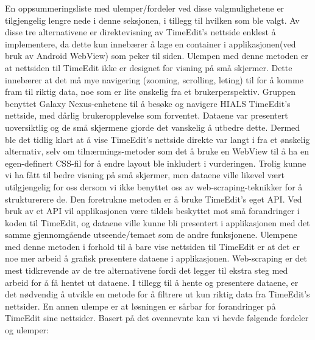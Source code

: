 \documentclass[../main.tex]{subfiles}
\begin{document}
En oppsummeringsliste med ulemper/fordeler ved disse valgmulighetene er tilgjengelig lengre nede i denne seksjonen, i tillegg til hvilken som ble valgt. \newline
\newline
Av disse tre alternativene er direktevisning av TimeEdit’s nettside enklest å implementere, da dette kun innebærer å lage en container i applikasjonen(ved bruk av Android WebView) som peker til siden. Ulempen med denne metoden er at nettsiden til TimeEdit ikke er designet for visning på små skjermer. Dette innebærer at det må mye navigering (zooming, scrolling, leting) til for å komme fram til riktig data, noe som er lite ønskelig fra et brukerperspektiv.\newline
Gruppen benyttet Galaxy Nexus-enhetene til å besøke og navigere HIALS TimeEdit’s nettside, med dårlig brukeropplevelse som forventet. Dataene var presentert uoversiktlig og de små skjermene gjorde det vanskelig å utbedre dette. Dermed ble det tidlig klart at å vise TimeEdit’s nettside direkte var langt i fra et ønskelig alternativ, selv om tilnærmings-metoder som det å bruke en WebView til å ha en egen-definert CSS-fil for å endre layout ble inkludert i vurderingen. \newline
Trolig kunne vi ha fått til bedre visning på små skjermer, men dataene ville likevel vært utilgjengelig for oss dersom vi ikke benyttet oss av web-scraping-teknikker for å strukturerere de.\newline
\newline
Den foretrukne metoden er å bruke TimeEdit’s eget API. Ved bruk av et API vil applikasjonen være tildels beskyttet mot små forandringer i koden til TimeEdit, og dataene ville kunne bli presentert i applikasjonen med det samme gjennomgående utseende/temaet som de andre funksjonene. Ulempene med denne metoden i forhold til å bare vise nettsiden til TimeEdit er at det er noe mer arbeid å grafisk presentere dataene i applikasjonen.\newline
Web-scraping er det mest tidkrevende av de tre alternativene fordi det legger til ekstra steg med arbeid for å få hentet ut dataene. I tillegg til å hente og presentere dataene, er det nødvendig å utvikle en metode for å filtrere ut kun riktig data fra TimeEdit’s nettsider. En annen ulempe er at løsningen er sårbar for forandringer på TimeEdit sine nettsider.
Basert på det ovennevnte kan vi hevde følgende fordeler og ulemper:
\end{document}
